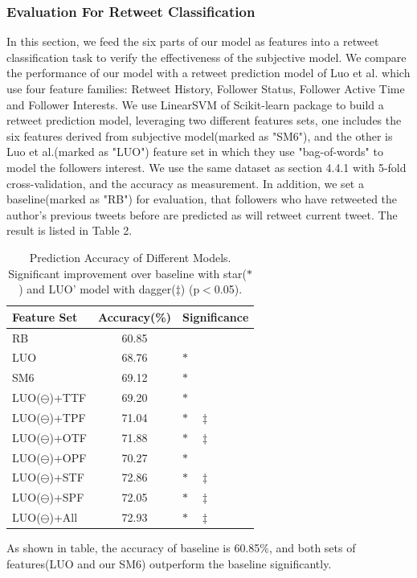 \documentclass{acm_proc_article-sp}
\begin{document}
\subsubsection{Evaluation For Retweet Classification}
In this section, we feed the six parts of our model as features into a retweet classification task to verify the effectiveness of the subjective model. 
We compare the performance of our model with a retweet prediction model of Luo et al.\cite{Luo:2013Sig} which use four feature families: Retweet History, Follower Status, Follower Active Time and Follower Interests. 
We use LinearSVM of Scikit-learn package to build a retweet prediction model, leveraging two different features sets, one includes the six features derived from subjective model(marked as "SM6"), and the other is Luo et al.\cite{Luo:2013Sig}(marked as "LUO") feature set in which they use "bag-of-words" to model the followers interest.  
We use the same dataset as section 4.4.1 with 5-fold cross-validation, and the accuracy as measurement.
In addition, we set a baseline(marked as "RB") for evaluation, that followers who have retweeted the author’s previous tweets before are predicted as will retweet current tweet. 
The result is listed in Table 2.
\begin{table}
\centering
\caption{Prediction Accuracy of Different Models. Significant improvement over baseline with star($ \ast $) and LUO' model with dagger($ \ddagger $) (p$ < $0.05).}
\begin{tabular}{|l|c|l|}
\hline
Feature Set & Accuracy(\%) & Significance\\
\hline
RB & 60.85 & \\
LUO & 68.76 & $ \ast  $\\
SM6 & 69.12 & $ \ast $ \\
LUO($ \ominus $)+TTF & 69.20 & $ \ast $ \\
LUO($ \ominus $)+TPF & 71.04 & $ \ast \quad \ddagger $ \\
LUO($ \ominus $)+OTF & 71.88 & $ \ast \quad \ddagger $ \\
LUO($ \ominus $)+OPF & 70.27 & $ \ast $ \\
LUO($ \ominus $)+STF & 72.86 & $ \ast \quad \ddagger $ \\
LUO($ \ominus $)+SPF & 72.05 & $ \ast \quad \ddagger $ \\
LUO($ \ominus $)+All & 72.93 & $ \ast \quad \ddagger $ \\
\hline
\end{tabular}
\end{table}
As shown in table, the accuracy of baseline is 60.85\%, and both sets of features(LUO and our SM6) outperform the baseline significantly. 
\end{document}
